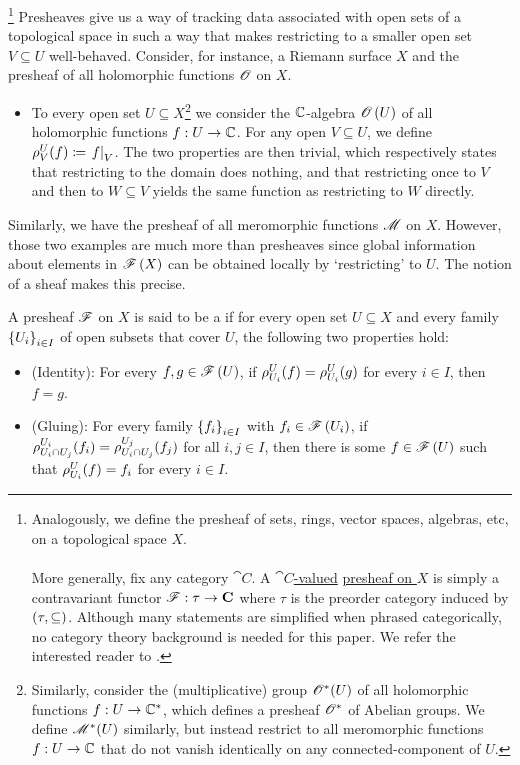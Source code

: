 \documentclass[../Moduli_Spaces_of_Riemann_Surfaces.tex]{subfiles}
\begin{document}
    \begin{remark}\footnote{Analogously, we define the presheaf of sets, rings, vector spaces, algebras, etc, on a topological space $X$.\\\ \\More generally, fix any category $\cat{C}$. A \ul{$\cat{C}$-valued} \ul{presheaf on $X$} is simply a contravariant functor $\mathscr{F}:\tau\to\textbf{C}$ where $\tau$ is the preorder category induced by $\left(\tau,\subseteq\right)$. Although many statements are simplified when phrased categorically, no category theory background is needed for this paper. We refer the interested reader to \cite{maclane}.}
        Presheaves give us a way of tracking data associated with open sets of a topological space in such a way that makes restricting to a smaller open set $V\subseteq U$ well-behaved. Consider, for instance, a Riemann surface $X$ and the presheaf of all holomorphic functions $\mathscr{O}$ on $X$.
        \begin{itemize}
            \item To every open set $U\subseteq X$\footnote{Similarly, consider the (multiplicative) group $\mathscr{O}^\ast\!\left(U\right)$ of all holomorphic functions $f:U\to\mathbb{C}^\ast$, which defines a presheaf $\mathscr{O}^\ast$ of Abelian groups. We define $\mathscr{M}^\ast\!\left(U\right)$ similarly, but instead restrict to all meromorphic functions $f:U\to\mathbb{C}$ that do not vanish identically on any connected-component of $U$.} we consider the $\mathbb{C}$-algebra $\mathscr{O}\left(U\right)$ of all holomorphic functions $f:U\to\mathbb{C}$. For any open $V\subseteq U$, we define $\rho^U_V\!\left(f\right)\coloneqq\left.f\right|_V$. The two properties are then trivial, which respectively states that restricting to the domain does nothing, and that restricting once to $V$ and then to $W\subseteq V$ yields the same function as restricting to $W$ directly.
        \end{itemize}
        Similarly, we have the presheaf of all meromorphic functions $\mathscr{M}$ on $X$. However, those two examples are much more than presheaves since global information about elements in $\mathscr{F}\left(X\right)$ can be obtained locally by `restricting' to $U$. The notion of a sheaf makes this precise.\exqed
    \end{remark}
    \begin{definition}
        A presheaf $\mathscr{F}$ on $X$ is said to be a  if for every open set $U\subseteq X$ and every family $\left\{U_i\right\}_{i\in I}$ of open subsets that cover $U$, the following two properties hold:
        \begin{itemize}
            \item (Identity): For every $f,g\in\mathscr{F}\left(U\right)$, if $\rho^U_{U_i}\!\left(f\right)=\rho^U_{U_i}\!\left(g\right)$ for every $i\in I$, then $f=g$.
                \vspace{-0.05in}
            \item (Gluing): For every family $\left\{f_i\right\}_{i\in I}$ with $f_i\in\mathscr{F}\left(U_i\right)$, if $\rho^{U_i}_{U_i\cap U_j}\!\left(f_i\right)=\rho^{U_j}_{U_i\cap U_j}\!\left(f_j\right)$ for all $i,j\in I$, then there is some $f\in\mathscr{F}\left(U\right)$ such that $\rho^U_{U_i}\!\left(f\right)=f_i$ for every $i\in I$.
        \end{itemize}
    \end{definition}
\end{document}
